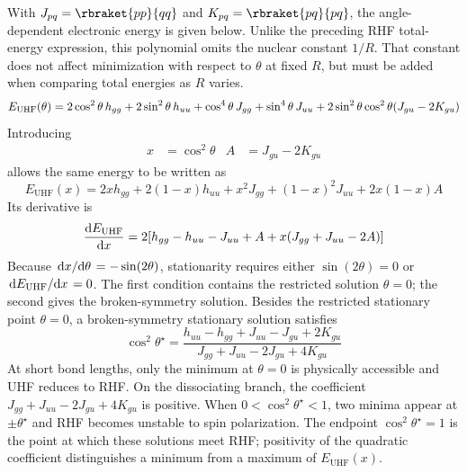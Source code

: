 \documentclass[11pt,a4paper,titlepage]{article}
\numberwithin{equation}{section}
\begin{document}
With $J_{pq}=\rbraket{pp}{qq}$ and $K_{pq}=\rbraket{pq}{pq}$, the
angle-dependent electronic energy is given below. Unlike the preceding RHF
total-energy expression, this polynomial omits the nuclear constant $1/R$.
That constant does not affect minimization with respect to $\theta$ at
fixed $R$, but must be added when comparing total energies as $R$ varies.
\begin{equation}
  E_\text{UHF}(\theta)
  =2\cos^2\theta\,h_{gg}
  +2\sin^2\theta\,h_{uu}
  +\cos^4\theta\,J_{gg}
  +\sin^4\theta\,J_{uu}
  \\
  +2\sin^2\theta\cos^2\theta\qty(J_{gu}-2K_{gu})
\end{equation}
Introducing
\begin{align}
  x&=\cos^2\theta
  &
  A&=J_{gu}-2K_{gu}
\end{align}
allows the same energy to be written as
\begin{equation}
  E_\text{UHF}(x)
  =
  2xh_{gg}+2(1-x)h_{uu}
  +x^2J_{gg}+(1-x)^2J_{uu}
  +2x(1-x)A
\end{equation}
Its derivative is
\begin{equation}
  \dv{E_\text{UHF}}{x}
  =
  2\qty[
  h_{gg}-h_{uu}-J_{uu}+A
  +x\qty(J_{gg}+J_{uu}-2A)
  ]
\end{equation}
Because $\dv*{x}{\theta}=-\sin(2\theta)$, stationarity requires either
$\sin(2\theta)=0$ or $\dv*{E_\text{UHF}}{x}=0$. The first condition contains
the restricted solution $\theta=0$; the second gives the broken-symmetry
solution.
Besides the restricted stationary point $\theta=0$, a
broken-symmetry stationary solution satisfies
\begin{equation}
    \cos^2\theta^\star
    =\frac{h_{uu}-h_{gg}+J_{uu}-J_{gu}+2K_{gu}}
      {J_{gg}+J_{uu}-2J_{gu}+4K_{gu}}
\end{equation}
At short bond lengths, only the minimum at $\theta=0$ is physically
accessible and UHF reduces to RHF. On the dissociating branch, the
coefficient $J_{gg}+J_{uu}-2J_{gu}+4K_{gu}$ is positive. When
$0<\cos^2\theta^\star<1$, two minima appear at $\pm\theta^\star$ and
RHF becomes unstable to spin polarization.
The endpoint $\cos^2\theta^\star=1$ is the point at which these solutions
meet RHF; positivity of the quadratic coefficient distinguishes a minimum
from a maximum of $E_\text{UHF}(x)$.
\end{document}
